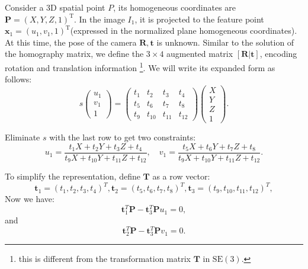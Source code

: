 Consider a 3D spatial point $P$, its homogeneous coordinates are ${\mathbf{P}}=(X,Y,Z,1)^{\mathrm{T}}$. In the image $I_{1}$, it is projected to the feature point ${\mathbf{x}}_{1}=(u_{1},v_{1},1)^{\mathrm{T}}$(expressed in the normalized plane homogeneous coordinates). At this time, the pose of the camera $\mathbf{R}, \mathbf{t}$ is unknown. Similar to the solution of the homography matrix, we define the $3\times 4$ augmented matrix $[\mathbf{R}|\mathbf{t}]$, encoding rotation and translation information \footnote{this is different from the transformation matrix $\mathbf{T}$ in $\mathrm{SE}(3)$. }. We will write its expanded form as follows:
\begin{equation}
s
\begin{pmatrix}
u_{1} \\ v_{1} \\ 1
\end{pmatrix}
=
\begin{pmatrix}
t_{1} & t_{2} & t_{3} & t_{4}\\ 
t_{5} & t_{6} & t_{7} & t_{8}\\ 
t_{9} & t_{10} & t_{11} & t_{12}
\end{pmatrix}
\begin{pmatrix}
X \\ Y \\ Z \\ 1
\end{pmatrix}.
\end{equation}

Eliminate $s$ with the last row to get two constraints:
\[
u_{1}=\frac{t_{1}X+t_{2}Y+t_{3}Z+t_{4}}{t_{9}X+t_{10}Y+t_{11}Z+t_{12}},\quad
v_{1}=\frac{t_{5}X+t_{6}Y+t_{7}Z+t_{8}}{t_{9}X+t_{10}Y+t_{11}Z+t_{12}}.
\]

To simplify the representation, define $\mathbf{T}$ as a row vector:
\[
\mathbf{t}_{1}=(t_{1},t_{2},t_{3},t_{4})^T,
\mathbf{t}_{2}=(t_{5},t_{6},t_{7},t_{8})^T,
\mathbf{t}_{3}=(t_{9},t_{10},t_{11},t_{12})^T,
\]
Now we have:
\[
\mathbf{t}_1^T\mathbf{P}-\mathbf{t}_3^T\mathbf{P} u_1=0,
\]
and
\[
\mathbf{t}_2^T\mathbf{P}-\mathbf{t}_3^T\mathbf{P} v_1=0.
\]

